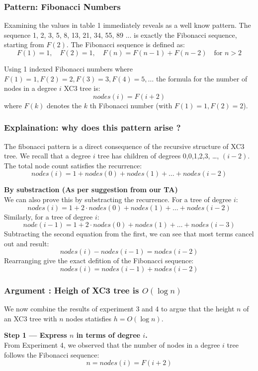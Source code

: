 \documentclass[letterpaper]{article}
\theoremstyle{plain}
\theoremstyle{definition}
\theoremstyle{remark}
\newcounter{experiment}
\begin{document}
\subsubsection*{Pattern: Fibonacci Numbers}
Examining the values in table 1 immediately reveals as a well know pattern. The sequence 1, 2, 3, 5, 8, 13, 21, 34, 55, 89
... is exactly the Fibonacci sequence, starting from $F(2)$.  The Fibonacci sequence is defined as:
$$F(1) = 1, \quad F(2) = 1, \quad F(n) = F(n - 1) + F(n - 2) \quad \text{for } n > 2$$

Using 1 indexed Fibonacci numbers where $F(1) = 1, F(2) = 2, F(3) = 3, F(4) = 5, \dots$
the formula for the number of nodes in a degree $i$ XC3 tree is:
$$nodes(i) = F (i + 2)$$ where $F(k)$ denotes the $k$ th Fibonacci number (with $F(1) = 1, F(2) = 2$).

\subsubsection*{Explaination: why does this pattern arise ?}
The fibonacci pattern is a direct consequence of the recursive structure of XC3 tree. We recall that a degree $i$ tree has
children of degrees 0,0,1,2,3, \dots, $(i - 2)$. The total node count satisfies the recurrence:
$$nodes (i) = 1 + nodes(0) + nodes(1) + \dots + nodes(i - 2)$$


\textbf{By substraction (As per suggestion from our TA)} \\

We can also prove this by substracting the recurrence. For a tree of degree $i$: 
$$nodes(i) = 1 + 2 \cdot nodes (0) + nodes (1) + \dots + nodes (i - 2)$$ 
Similarly, for a tree of degree $i$:
$$node(i - 1) = 1 + 2 \cdot nodes (0) + nodes (1) + \dots + nodes(i - 3)$$
Subtracting the second equation from the first, we can see that most terms cancel out and result: 
$$nodes(i) - nodes(i - 1) = nodes(i - 2)$$
Rearranging give the exact defition of the Fibonacci sequence: 
$$nodes(i) = nodes (i - 1) + nodes (i - 2)$$ 


\subsubsection*{ Argument : Heigh of XC3 tree is $O(\log n)$}
We now combine the results of experiment 3 and 4 to argue that the height $n$ of an XC3 tree with $n$ nodes statisfies 
$h = O(\log n)$. 

\textbf{Step 1 — Express $n$ in terms of degree $i$.} \\
From Experiment 4, we observed that the number of nodes in a degree $i$ tree
follows the Fibonacci sequence:
$$n = nodes(i) = F(i + 2)$$
\end{document}
